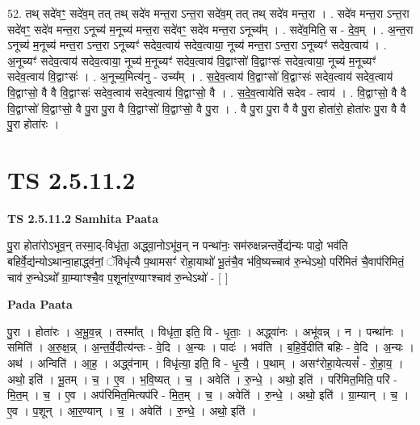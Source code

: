 \documentclass[17pt]{extarticle}
\begin{document}
52. तथ् सदे॑वꣳ॒॒ सदे॑व॒म् तत् तथ् सदे॑व मन्त॒रा ऽन्त॒रा सदे॑व॒म् तत् तथ् सदे॑व मन्त॒रा । . सदे॑व मन्त॒रा ऽन्त॒रा सदे॑वꣳ॒॒ सदे॑व मन्त॒रा ऽनूच्य॑ म॒नूच्य॑ मन्त॒रा सदे॑वꣳ॒॒ सदे॑व मन्त॒रा ऽनूच्य᳚म् । . सदे॑व॒मिति॒ स - दे॒व॒म् । . अ॒न्त॒रा ऽनूच्य॑ म॒नूच्य॑ मन्त॒रा ऽन्त॒रा ऽनूच्यꣳ॑ सदेव॒त्वाय॑ सदेव॒त्वाया॒ नूच्य॑ मन्त॒रा ऽन्त॒रा ऽनूच्यꣳ॑ सदेव॒त्वाय॑ । . अ॒नूच्यꣳ॑ सदेव॒त्वाय॑ सदेव॒त्वाया॒ नूच्य॑ म॒नूच्यꣳ॑ सदेव॒त्वाय॑ वि॒द्वाꣳसो॑ वि॒द्वाꣳसः॑ सदेव॒त्वाया॒ नूच्य॑ म॒नूच्यꣳ॑ सदेव॒त्वाय॑ वि॒द्वाꣳसः॑ । . अ॒नूच्य॒मित्य॑नु - उच्य᳚म् । . स॒दे॒व॒त्वाय॑ वि॒द्वाꣳसो॑ वि॒द्वाꣳसः॑ सदेव॒त्वाय॑ सदेव॒त्वाय॑ वि॒द्वाꣳसो॒ वै वै वि॒द्वाꣳसः॑ सदेव॒त्वाय॑ सदेव॒त्वाय॑ वि॒द्वाꣳसो॒ वै । . स॒दे॒व॒त्वायेति॑ सदेव - त्वाय॑ । . वि॒द्वाꣳसो॒ वै वै वि॒द्वाꣳसो॑ वि॒द्वाꣳसो॒ वै पु॒रा पु॒रा वै वि॒द्वाꣳसो॑ वि॒द्वाꣳसो॒ वै पु॒रा । . वै पु॒रा पु॒रा वै वै पु॒रा होता॑रो॒ होता॑रः पु॒रा वै वै पु॒रा होता॑रः । \newline
\pagebreak
{}

\section{ TS 2.5.11.2 }

\textbf{TS 2.5.11.2 } \newline
\textbf{Samhita Paata} \newline

पु॒रा होता॑रोऽभूव॒न् तस्मा॒द्-विधृ॑ता॒ अद्ध्वा॒नोऽभू॑व॒न् न पन्था॑नः॒ सम॑रुक्षन्नन्तर्वे॒द्य॑न्यः पादो॒ भव॑ति बहिर्वे॒द्य॑न्योऽथान्वा॒हाद्ध्व॑नां॒ ॅविधृ॑त्यै प॒थामसꣳ॑ रोहा॒याथो॑ भू॒तंचै॒व भ॑वि॒ष्यच्चाव॑ रु॒न्धेऽथो॒ परि॑मितं चै॒वाप॑रिमितं॒ चाव॑ रु॒न्धेऽथो᳚ ग्रा॒म्याꣳश्चै॒व प॒शूना॑र॒ण्याꣳश्चाव॑ रु॒न्धेऽथो॑ - [  ] \newline

\textbf{Pada Paata} \newline

पु॒रा । होता॑रः । अ॒भू॒व॒न्न् । तस्मा᳚त् । विधृ॑ता॒ इति॒ वि - धृ॒ताः॒ । अद्ध्वा॑नः । अभू॑वन्न् । न । पन्था॑नः । समिति॑ । अ॒रु॒क्ष॒न्न् । अ॒न्त॒र्वे॒दीत्य॑न्तः - वे॒दि । अ॒न्यः । पादः॑ । भव॑ति । ब॒हि॒र्वे॒दीति॑ बहिः - वे॒दि । अ॒न्यः । अथ॑ । अन्विति॑ । आ॒ह॒ । अद्ध्व॑नाम् । विधृ॑त्या॒ इति॒ वि - धृ॒त्यै॒ । प॒थाम् । असꣳ॑रोहा॒येत्यसं᳚ - रो॒हा॒य॒ । अथो॒ इति॑ । भू॒तम् । च॒ । ए॒व । भ॒वि॒ष्यत् । च॒ । अवेति॑ । रु॒न्धे॒ । अथो॒ इति॑ । परि॑मित॒मिति॒ परि॑ - मि॒त॒म् । च॒ । ए॒व । अप॑रिमित॒मित्यप॑रि - मि॒त॒म् । च॒ । अवेति॑ । रु॒न्धे॒ । अथो॒ इति॑ । ग्रा॒म्यान् । च॒ । ए॒व । प॒शून् । आ॒र॒ण्यान् । च॒ । अवेति॑ । रु॒न्धे॒ । अथो॒ इति॑ ।  \newline
\end{document}
